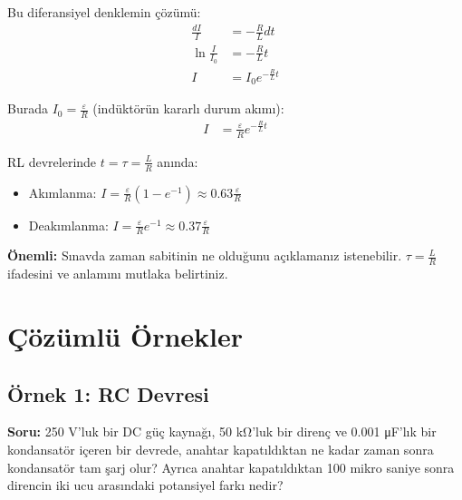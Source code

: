 \documentclass[11pt,letterpaper,twocolumn]{fenbil}
\begin{document}
Bu diferansiyel denklemin çözümü:
\begin{align}
\frac{dI}{I} &= -\frac{R}{L}dt\\
\ln\frac{I}{I_0} &= -\frac{R}{L}t\\
I &= I_0 e^{-\frac{R}{L}t}
\end{align}

Burada $I_0 = \frac{\varepsilon}{R}$ (indüktörün kararlı durum akımı):
\begin{align}
I &= \frac{\varepsilon}{R}e^{-\frac{R}{L}t}
\end{align}

\begin{tcolorbox}[title=SINAV İÇİN]
RL devrelerinde $t = \tau = \frac{L}{R}$ anında:
\begin{itemize}
\item Akımlanma: $I = \frac{\varepsilon}{R}(1-e^{-1}) \approx 0.63\frac{\varepsilon}{R}$
\item Deakımlanma: $I = \frac{\varepsilon}{R}e^{-1} \approx 0.37\frac{\varepsilon}{R}$
\end{itemize}
\textbf{Önemli:} Sınavda zaman sabitinin ne olduğunu açıklamanız istenebilir. $\tau = \frac{L}{R}$ ifadesini ve anlamını mutlaka belirtiniz.
\end{tcolorbox}

\section{Çözümlü Örnekler}

\subsection{Örnek 1: RC Devresi}

\begin{tcolorbox}
\textbf{Soru:} 250 V'luk bir DC güç kaynağı, 50 kΩ'luk bir direnç ve 0.001 μF'lık bir kondansatör içeren bir devrede, anahtar kapatıldıktan ne kadar zaman sonra kondansatör tam şarj olur? Ayrıca anahtar kapatıldıktan 100 mikro saniye sonra direncin iki ucu arasındaki potansiyel farkı nedir?
\end{tcolorbox}
\end{document}
